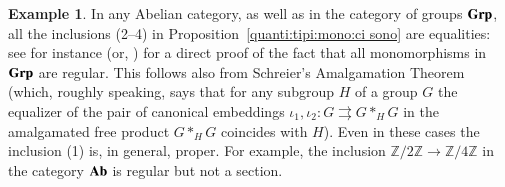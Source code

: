 \documentclass[12pt]{article}
\theoremstyle{definition}
\newtheorem{example}[lemma]{Example}
\def\Z{\mathbb Z}
\newcommand{\Ab}{\textbf{\textup{Ab}}}
\newcommand{\Grp}{\textbf{\textup{Grp}}}
\numberwithin{equation}{section}
\begin{document}
 





\begin{example}
In any Abelian category, as well as in the  category of groups $\Grp$, all the inclusions (2--4) in Proposition~\ref{quanti:tipi:mono:ci sono} are equalities: see for instance \cite[Exercise 7H(a)]{cats} (or, \cite[Exercise 6.B]{DT}) for a direct proof of the fact that all monomorphisms in $\Grp$ are regular.
	This follows also from Schreier's Amalgamation Theorem \cite{Schr} (which, roughly speaking, says that for any subgroup $H$ of a group $G$ the equalizer of 
	the pair of canonical embeddings $\iota_1,\iota_2\colon G \rightrightarrows G*_HG$ in the amalgamated free product $G*_HG$ coincides with $H$). Even in these cases the inclusion (1) is, in general, proper. For example, the inclusion $\Z/2\Z\to \Z/4\Z$ in the category $\Ab$ is regular but not a section.
 \end{example}
\end{document}
